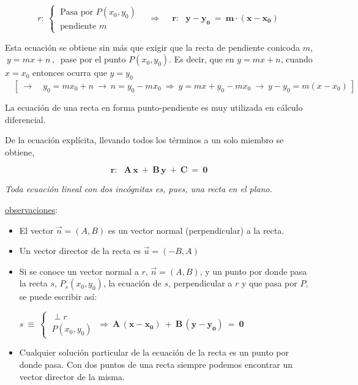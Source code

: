 \begin{definition}

$$r: \ \begin{cases} \ \text{Pasa por } P(x_0,y_0) \\ \ \text{pendiente } m \end{cases} \quad \Rightarrow \quad \boxed{ \ \boldsymbol{ r:\  \ \  y-y_0 \ = \ m\cdot (x-x_0) } \ }$$

\end{definition}

Esta ecuación se obtiene sin más que exigir que la recta de pendiente conicoda $m$, $\ y=mx+n\, , \  $ pase por el punto $P(x_0,y_0)$. Es decir, que en $y=mx+n$, cuando $x=x_0$ entonces ocurra que $y=y_0$
\textcolor{gris}{$\quad [\ \to \quad y_0=mx_0+n \ \to \ n=y_0-mx_0 \ \Rightarrow \ y=mx+y_0-mx_0 \ \to \ y-y_0=m(x-x_0) \ ]$ \QED}

La ecuación de una recta en forma punto-pendiente es muy utilizada en cálculo diferencial.

\vspace{5mm}
\begin{definition}
	
	De la ecuación explícita, llevando todos los términos a un solo miembro se obtiene,

$$\boxed{ \ \boldsymbol{ r:\  \ \ A\,  x \ + \  B\,  y \ + \  C  \ =\  0} \ }$$

\emph{Toda ecuación lineal con dos incógnitas es, pues, una recta en el plano.}
\end{definition}

\underline{observaciones}:

\begin{itemize}
	\item El vector $\vec n =(A,B)$ es un vector normal (perpendicular) a la recta.
	\item Un vector director de la recta es $\vec u=(-B,A)$
	\item Si se conoce un vector normal a $r$, $\vec n=(A,B)$, y un punto por donde pasa la recta $s$, $P_s(x_0, y_0)$, la ecuación de $s$, perpendicular a $r$ y que pasa por $P$, se puede escribir así:    

$s\ \equiv \ \begin{cases} \ \perp  r \\ \ P(x_0,y_0) \end{cases} \ \Rightarrow \ \boldsymbol{ A\, (x-x_0) \ + \ B\,  (y-y_0) \ =\  0}$
\item Cualquier solución particular de la ecuación de la recta es un punto por donde pasa. Con dos puntos de una recta siempre podemos encontrar un vector director de la misma.
\end{itemize}

